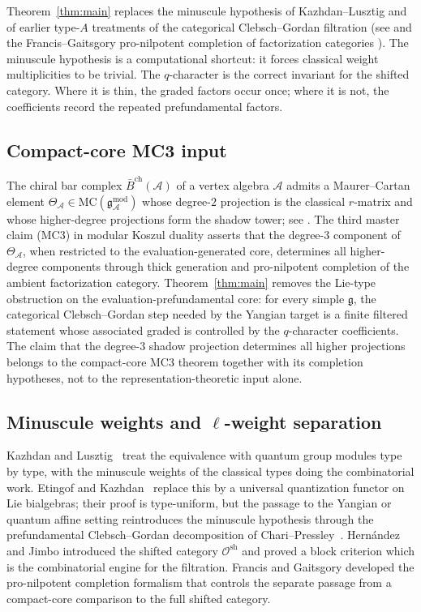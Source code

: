\documentclass[11pt,reqno]{amsart}
\theoremstyle{definition}
\theoremstyle{remark}
\newcommand{\cA}{\mathcal{A}}
\newcommand{\cO}{\mathcal{O}}
\newcommand{\fg}{\mathfrak{g}}
\newcommand{\MC}{\mathrm{MC}}
\newcommand{\barB}{\bar{B}}
\numberwithin{equation}{section}
\begin{document}
Theorem~\ref{thm:main} replaces the minuscule hypothesis of
Kazhdan--Lusztig and of earlier type-$A$ treatments of the
categorical Clebsch--Gordan filtration (see
\cite[\S 11]{ChariPressley94} and the Francis--Gaitsgory
pro-nilpotent completion of factorization categories
\cite{FG12}). The minuscule hypothesis is a computational shortcut:
it forces classical weight multiplicities to be trivial. The
$q$-character is the correct invariant for the shifted category.
Where it is thin, the graded factors occur once; where it is not,
the coefficients record the repeated prefundamental factors.

\subsection{Compact-core MC3 input}

The chiral bar complex $\barB^{\mathrm{ch}}(\cA)$ of a vertex
algebra $\cA$ admits a Maurer--Cartan element
$\Theta_\cA \in \MC(\fg^{\mathrm{mod}}_\cA)$ whose degree-$2$
projection is the classical $r$-matrix and whose higher-degree
projections form the shadow tower; see
\cite[Vol.\ I]{LorgatMKD}. The third master claim (MC3) in
modular Koszul duality asserts that the degree-$3$
component of $\Theta_\cA$, when restricted to the
evaluation-generated core, determines all higher-degree
components through thick generation and pro-nilpotent completion
of the ambient factorization category.
Theorem~\ref{thm:main} removes the Lie-type obstruction on the
evaluation-prefundamental core: for every simple $\fg$, the
categorical Clebsch--Gordan step needed by the Yangian target is a
finite filtered statement whose associated graded is controlled by
the $q$-character coefficients. The claim that the degree-$3$
shadow projection determines all higher projections belongs to the
compact-core MC3 theorem together with its completion hypotheses,
not to the representation-theoretic input alone.

\subsection{Minuscule weights and $\ell$-weight separation}

Kazhdan and Lusztig~\cite{KL93a} treat the equivalence with
quantum group modules type by type, with the minuscule weights of
the classical types doing the combinatorial work. Etingof and
Kazhdan~\cite{EK96, EK98} replace this by a universal
quantization functor on Lie bialgebras; their proof is
type-uniform, but the passage to the Yangian or quantum affine
setting reintroduces the minuscule hypothesis through the
prefundamental Clebsch--Gordan decomposition of
Chari--Pressley~\cite{ChariPressley94}. Hern\'andez and Jimbo
\cite{HernandezJimbo12} introduced the shifted category
$\cO^{\mathrm{sh}}$ and proved a block criterion which is the
combinatorial engine for the filtration. Francis and Gaitsgory
\cite{FG12} developed the pro-nilpotent completion formalism that
controls the separate passage from a compact-core comparison to the
full shifted category.
\end{document}
